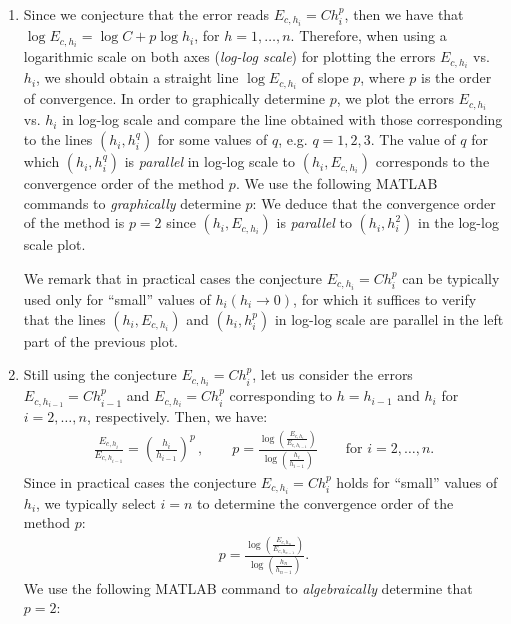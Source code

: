 \documentclass[11pt]{article}
\begin{document}
\begin{enumerate}

\item Since we conjecture that the error reads $E_{c,h_i}=C h_i^p$, then we have that $\log E_{c,h_i} = \log C + p\log h_i$, for $h = 1, \ldots, n$. Therefore, when using a logarithmic scale on both axes (\textit{log-log scale}) for plotting the errors $E_{c,h_i}$ vs. $h_i$, we should obtain a straight line $\log E_{c,h_i}$ of slope $p$, where $p$ is the order of convergence. In order to graphically determine $p$, we plot the errors $E_{c,h_i}$ vs. $h_i$ in log-log scale and compare the line obtained with those corresponding to the lines $(h_i,h_i^q)$ for some values of $q$, e.g. $q=1,2,3$. The value of $q$ for which $(h_i,h_i^q)$ is \textit{parallel} in log-log scale to $(h_i,E_{c,h_i})$ corresponds to the convergence order of the method $p$. We use the following MATLAB commands to \textit{graphically} determine $p$:
\FloatBarrier
We deduce that the convergence order of the method is $p=2$ since $(h_i,E_{c,h_i})$ is \textit{parallel} to $(h_i,h_i^2)$ in the log-log scale plot.

We remark that in practical cases the conjecture $E_{c,h_i}=C h_i^p$ can be typically used only for ``small'' values of $h_i (h_i \rightarrow 0)$, for which it suffices to verify that the lines $(h_i,E_{c,h_i})$ and $(h_i,h_i^p)$ in log-log scale are parallel in the left part of the previous plot.
\FloatBarrier
\item Still using the conjecture $E_{c,h_i}=C h_i^p$, let us consider the errors $E_{c,h_{i-1}}=C h_{i-1}^p$ and $E_{c,h_i}=C h_i^p$ corresponding to $h=h_{i-1}$ and $h_i$ for $i=2, \ldots , n$, respectively. Then, we have:
\begin{align*}
\frac{E_{c,h_i}}{E_{c,h_{i-1}}} = \left( \frac{h_i}{h_{i-1}} \right)^p \, , \qquad p = \frac{\log \left( \frac{E_{c,h_i}}{E_{c,h_{i-1}}} \right)}{\log \left( \frac{h_i}{h_{i-1}} \right)} \qquad \text{for} \, \, i = 2, \ldots, n.
\end{align*}
Since in practical cases the conjecture $E_{c,h_i}=C h_i^p$ holds for  ``small'' values of $h_i$, we typically select $i=n$ to determine the convergence order of the method $p$:
\begin{align*}
p = \frac{\log \left( \frac{E_{c,h_n}}{E_{c,h_{n-1}}} \right)}{\log \left( \frac{h_n}{h_{n-1}} \right)}.
\end{align*}
We use the following MATLAB command to \textit{algebraically} determine that $p=2$:
\end{enumerate}
\end{document}

